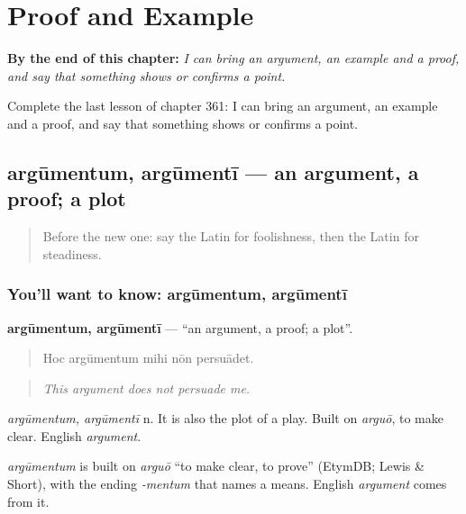 
\chapter{Proof and Example}
\label{ch:la-proof-and-example}

\begin{chapteropening}
\textbf{By the end of this chapter:} \emph{I can bring an argument, an example and a proof, and say that something shows or confirms a point.}

Complete the last lesson of chapter 361: I can bring an argument, an example and a proof, and say that something shows or confirms a point.
\end{chapteropening}

\section[argūmentum, argūmentī]{argūmentum, argūmentī — an argument, a proof; a plot}

\label{lesson:LA-C361-argumentum}



\begin{quote}
Before the new one: say the Latin for foolishness, then the Latin for steadiness.
\end{quote}

\subsection*{You'll want to know: argūmentum, argūmentī}
\textbf{argūmentum, argūmentī} — \textquotedblleft{}an argument, a proof; a plot\textquotedblright{}.

\begin{quote}
Hoc argūmentum mihi nōn persuādet.
\end{quote}

\begin{quote}
\emph{This argument does not persuade me.}
\end{quote}

\emph{argūmentum, argūmentī} n. It is also the plot of a play. Built on \emph{arguō}, to make clear. English \emph{argument}.

\begin{cousinweb}
\emph{argūmentum} is built on \emph{arguō} \textquotedblleft{}to make clear, to prove\textquotedblright{} (EtymDB; Lewis \& Short), with the ending \emph{-mentum} that names a means. English \emph{argument} comes from it.
\end{cousinweb}

